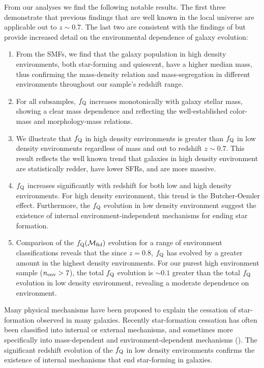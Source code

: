 \documentclass{emulateapj}
\begin{document}
From our analyses we find the following notable results. The first
three demonstrate that previous findings that are well known in the
local universe are applicable out to $z\sim 0.7$. The last two are
consistent with the findings of \cite{Peng:2010aa} but provide increased
detail on the environmental dependence of galaxy evolution:
\begin{enumerate}
	\item From the SMFs, we find that the galaxy population in high
    density environments, both star-forming and quiescent, have a
    higher median mass, thus confirming the mass-density relation and
    mass-segregation in different environments throughout our sample's
    redshift range.
	\item For all subsamples, $f_{\rm{Q}}$ increases monotonically with
    galaxy stellar mass, showing a clear mass dependence and
    reflecting the well-established color-mass and morphology-mass
    relations.
	\item We illustrate that $f_{\rm{Q}}$ in high density environments
    is greater than $f_{\rm{Q}}$ in low density environments
    regardless of mass and out to redshift $z\sim 0.7$. This result
    reflects the well known trend that galaxies in high density
    environment are statistically redder, have lower SFRs, and are
    more massive.
	\item $f_{\rm{Q}}$ increases significantly with redshift for both
    low and high density environments. For high density environment,
    this trend is the Butcher-Oemler effect. Furthermore, the
    $f_{\rm{Q}}$ evolution in low density environment suggest the
    existence of internal environment-independent mechanisms for
    ending star formation.
	\item Comparison of the $f_{\rm{Q}}(\mathcal{M}_{\rm{fid}})$
    evolution for a range of environment classifications reveals that
    the since $z = 0.8$, $f_{\rm{Q}}$ has evolved by a greater amount
    in the highest density environments. For our purest high
    environment sample ($n_{\rm{env}} > 7$), the total $f_{\rm{Q}}$
    evolution is $\sim 0.1$ greater than the total $f_{\rm{Q}}$
    evolution in low density environment, revealing a moderate
    dependence on environment.
\end{enumerate}

Many physical mechanisms have been proposed to explain the cessation
of star-formation observed in many galaxies. Recently star-formation
cessation has often been classified into internal or external
mechanisms, and sometimes more specifically into mass-dependent and
environment-dependent mechanisms (\citealt{Baldry:2006aa,
  Peng:2010aa}). The significant redshift evolution of the
$f_{\rm{Q}}$ in low density environments confirms the existence of
internal mechanisms that end star-forming in galaxies.
\end{document}
